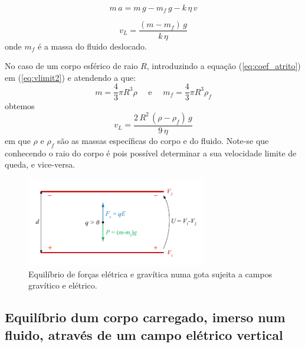 \documentclass[a4paper,twoside,12pt]{article}      %
\begin{document}
\begin{equation}
	\label{eq:mov2}
	m\,a = m\,g - m_f\,g  - k  \, \eta \, v
\end{equation}


\begin{equation}
	\label{eq:vlimit2}
	v_L = \frac{(m - m_f)\,g}{k  \, \eta}
\end{equation}
onde $m_f$ é a massa do fluido deslocado.

No caso de um corpo esférico de raio $R$, introduzindo a equação (\ref{eq:coef_atrito}) em (\ref{eq:vlimit2}) e atendendo a que:
\begin{equation*}
	m = \frac{4}{3} \pi R^3 \rho \quad \textrm{  e } \quad  m_f = \frac{4}{3} \pi R^3 \rho_f
\end{equation*}
obtemos
\begin{equation}
	\label{eq:vlimit3}
	v_L = \frac{2\,R^2\, (\rho - \rho_f)\,g}{9  \, \eta}
\end{equation}
em que $\rho$  e $\rho_f$ são as massas específicas do corpo e do fluido. Note-se que conhecendo o raio do corpo é pois possível determinar  a sua velocidade limite de queda, e vice-versa.

%


\begin{figure}
	[tb]  \centering 
	\includegraphics[width=0.7\textwidth]{./F_equil}
	\caption{Equilíbrio de forças elétrica e gravítica numa gota sujeita a campos gravítico e elétrico. \label{fig:f_equil}} 
\end{figure}


\subsection{\sf Equilíbrio dum corpo carregado, imerso num fluido, através de um campo elétrico vertical}
\end{document}
